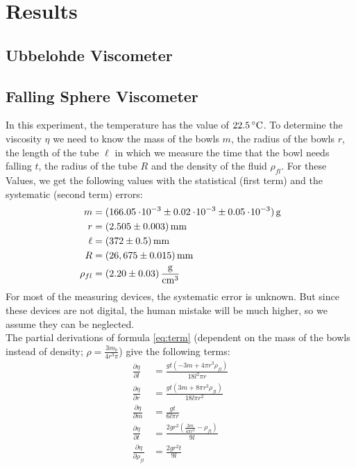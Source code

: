 \section{Results}

\subsection{Ubbelohde Viscometer}


\subsection{Falling Sphere Viscometer}
In this experiment, the temperature has the value of $22.5\C$. To determine the viscosity $\eta$ we need to know the mass of the bowls $m$, the radius of the bowls $r$, the length of the tube $\ell$ in which we measure the time that the bowl needs falling $t$, the radius of the tube $R$ and the density of the fluid $\rho_{fl}$. For these Values, we get the following values with the statistical (first term) and the systematic (second term) errors:
\begin{align*}
m &= \unit[(166.05\e{-3} \pm 0.02 \e{-3} \pm 0.05\e{-3})]{g}\\
r &= \unit[(2.505 \pm 0.003)]{mm}\\
\ell &= \unit[(372 \pm 0.5)]{mm}\\
R &= \unit[(26,675 \pm 0.015)]{mm}\\
\rho_{fl} &= \unit[(2.20 \pm 0.03)]{\frac{g}{cm^3}}
\end{align*}
For most of the measuring devices, the systematic error is unknown. But since these devices are not digital, the human mistake will be much higher, so we assume they can be neglected. \\
The partial derivations of formula \ref{eq:term} (dependent on the mass of the bowls instead of density; $\rho = \frac{3m_b}{4r^3\pi}$) give the following terms:
\begin{align*}
\frac{\partial \eta}{\partial l}  &= \frac{g t \left(-3 m+4 \pi  r^3 \rho_{fl}\right)}{18 l^2 \pi  r}\\
\frac{\partial \eta}{\partial r} &= \frac{g t \left(3 m+8 \pi  r^3 \rho_{fl}\right)}{18 l \pi  r^2}\\
\frac{\partial \eta}{\partial m} &= \frac{g t}{6 l \pi  r}\\
\frac{\partial \eta}{\partial t} &= \frac{2 g r^2 \left(\frac{3 m}{4 \pi  r^3}- \rho_{fl}\right)}{9 l}\\
\frac{\partial \eta}{\partial \rho_{fl}} &= \frac{2 g r^2 t}{9 l}
\end{align*}

